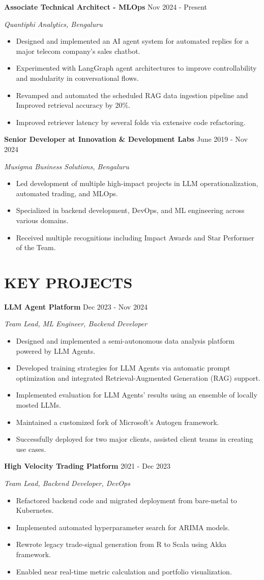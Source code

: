 \documentclass[fontsize=11pt]{article}
\newcommand{\NewPart}[1]{\section*{\uppercase{#1}}}
\newcommand{\WorkEntry}[4]{
    \noindent \textbf{#1} \hfill {#2} \par
    \noindent \textit{#3} \par
    \noindent \small #4
    \normalsize \par}
\newcommand{\ProjectEntry}[4]{
    \noindent \textbf{#1} \hfill {#2} \par
    \noindent \textit{#3} \par
    \noindent \small #4
    \normalsize \par}
\begin{document}
\WorkEntry
{Associate Technical Architect - MLOps}
{Nov 2024 - Present}
{Quantiphi Analytics, Bengaluru}
{%
\begin{itemize}
\item Designed and implemented an AI agent system for automated replies for a major telecom company's sales chatbot.
\item Experimented with LangGraph agent architectures to improve controllability and modularity in conversational flows.
\item Revamped and automated the scheduled RAG data ingestion pipeline and Improved retrieval accuracy by 20\%.
\item Improved retriever latency by several folds via extensive code refactoring.
\end{itemize}}
\WorkEntry
{Senior Developer at Innovation \& Development Labs}
{June 2019 - Nov 2024}
{Musigma Business Solutions, Bengaluru}
{%
\begin{itemize}
\item Led development of multiple high-impact projects in LLM operationalization, automated trading, and MLOps.
\item Specialized in backend development, DevOps, and ML engineering across various domains.
\item Received multiple recognitions including Impact Awards and Star Performer of the Team.
\end{itemize}}

\NewPart{KEY PROJECTS}

\ProjectEntry{LLM Agent Platform}{Dec 2023 - Nov 2024}{Team Lead, ML Engineer, Backend Developer}
{%
\begin{itemize}
\item Designed and implemented a semi-autonomous data analysis platform powered by LLM Agents.
\item Developed training strategies for LLM Agents via automatic prompt optimization and integrated Retrieval-Augmented Generation (RAG) support.
\item Implemented evaluation for LLM Agents' results using an ensemble of locally mosted LLMs.
\item Maintained a customized fork of Microsoft's Autogen framework.
\item Successfully deployed for two major clients, assisted client teams in creating use cases.
\end{itemize}}

\newpage
\ProjectEntry{High Velocity Trading Platform}{2021 - Dec 2023}{Team Lead, Backend Developer, DevOps}
{%
\begin{itemize}
\item Refactored backend code and migrated deployment from bare-metal to Kubernetes.
\item Implemented automated hyperparameter search for ARIMA models.
\item Rewrote legacy trade-signal generation from R to Scala using Akka framework.
\item Enabled near real-time metric calculation and portfolio visualization.
\end{itemize}}
\end{document}

